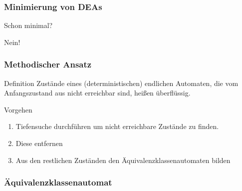 \documentclass{beamer}
\begin{document}
\begin{frame}
\frametitle{Minimierung von DEAs}
\begin{block}{Schon minimal?}
\begin{figure}[H]
\begin{center}
\end{center}
\end{figure}
\end{block}
\pause
\begin{block}{Nein!}
 \begin{figure}[H]
\begin{center}
\end{center}
\end{figure}
\end{block}
\end{frame}
\begin{frame}
 \frametitle{Methodischer Ansatz}
 \begin{block}{Definition}
  Zustände eines (deterministischen) endlichen Automaten, die vom Anfangszustand aus nicht erreichbar sind, heißen überflüssig.
 \end{block}
\begin{block}{Vorgehen}
 \begin{enumerate}
  \item Tiefensuche durchführen um nicht erreichbare Zustände zu finden.
  \item Diese entfernen
  \item Aus den restlichen Zuständen den Äquivalenzklassenautomaten bilden
 \end{enumerate}
\end{block}
\end{frame}
\begin{frame}
 \frametitle{Äquivalenzklassenautomat}
 
\end{frame}






\end{document}
